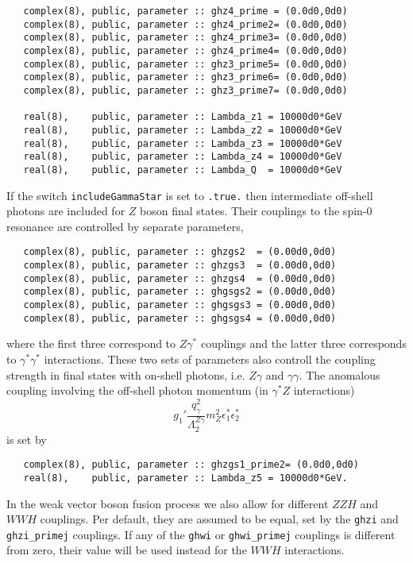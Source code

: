 \documentclass[aps,superscriptaddress,nofootinbib]{revtex4}
\begin{document}
\begin{verbatim}
   complex(8), public, parameter :: ghz4_prime = (0.0d0,0d0)
   complex(8), public, parameter :: ghz4_prime2= (0.0d0,0d0)
   complex(8), public, parameter :: ghz4_prime3= (0.0d0,0d0)
   complex(8), public, parameter :: ghz4_prime4= (0.0d0,0d0)
   complex(8), public, parameter :: ghz3_prime5= (0.0d0,0d0)
   complex(8), public, parameter :: ghz3_prime6= (0.0d0,0d0)
   complex(8), public, parameter :: ghz3_prime7= (0.0d0,0d0)

   real(8),    public, parameter :: Lambda_z1 = 10000d0*GeV
   real(8),    public, parameter :: Lambda_z2 = 10000d0*GeV
   real(8),    public, parameter :: Lambda_z3 = 10000d0*GeV
   real(8),    public, parameter :: Lambda_z4 = 10000d0*GeV   
   real(8),    public, parameter :: Lambda_Q  = 10000d0*GeV   
\end{verbatim}

If the switch \verb|includeGammaStar| is set to \verb|.true.| then intermediate off-shell photons are included for $Z$ boson final states. 
Their couplings to the spin-0 resonance are controlled by separate parameters,
\begin{verbatim}
   complex(8), public, parameter :: ghzgs2  = (0.00d0,0d0)
   complex(8), public, parameter :: ghzgs3  = (0.00d0,0d0)
   complex(8), public, parameter :: ghzgs4  = (0.00d0,0d0)
   complex(8), public, parameter :: ghgsgs2 = (0.00d0,0d0)
   complex(8), public, parameter :: ghgsgs3 = (0.00d0,0d0)
   complex(8), public, parameter :: ghgsgs4 = (0.00d0,0d0)
\end{verbatim}
where the first three correspond to $Z\gamma^*$ couplings and the latter three corresponds to $\gamma^* \gamma^*$ interactions.
These two sets of parameters also controll the coupling strength in final states with on-shell photons, i.e. $Z\gamma$ and $\gamma\gamma$.
The anomalous coupling involving the off-shell photon momentum (in $\gamma^* Z$ interactions)
\[
g_1' \frac{ q^2_\gamma }{ \Lambda_2^{Z\gamma} } m_Z^2 \epsilon^*_1 \epsilon^*_2
\]
is set by
\begin{verbatim}
   complex(8), public, parameter :: ghzgs1_prime2= (0.0d0,0d0)
   real(8),    public, parameter :: Lambda_z5 = 10000d0*GeV.
\end{verbatim}

In the weak vector boson fusion process we also allow for different $ZZH$ and $WWH$ couplings. 
Per default, they are assumed to be equal, set by the {\tt ghzi} and {\tt ghzi\_primej} couplings.
If any of the {\tt ghwi} or {\tt ghwi\_primej} couplings is different from zero,
their value will be used instead for the $WWH$ interactions.
\end{document}
